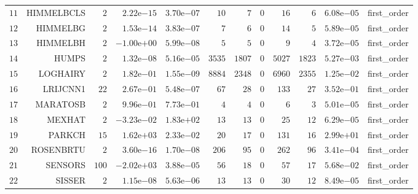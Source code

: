 \begin{longtable}{rrrrrrrrrrrr}
  \(    11\) & HIMMELBCLS & \(     2\) & \( 2.22\)e\(-15\) & \( 3.70\)e\(-07\) & \(    10\) & \(     7\) & \(     0\) & \(    16\) & \(     6\) & \( 6.08\)e\(-05\) & first\_order \\
  \(    12\) & HIMMELBG & \(     2\) & \( 1.53\)e\(-14\) & \( 3.83\)e\(-07\) & \(     7\) & \(     6\) & \(     0\) & \(    14\) & \(     5\) & \( 5.89\)e\(-05\) & first\_order \\
  \(    13\) & HIMMELBH & \(     2\) & \(-1.00\)e\(+00\) & \( 5.99\)e\(-08\) & \(     5\) & \(     5\) & \(     0\) & \(     9\) & \(     4\) & \( 3.72\)e\(-05\) & first\_order \\
  \(    14\) & HUMPS & \(     2\) & \( 1.32\)e\(-08\) & \( 5.16\)e\(-05\) & \(  3535\) & \(  1807\) & \(     0\) & \(  5027\) & \(  1823\) & \( 5.27\)e\(-03\) & first\_order \\
  \(    15\) & LOGHAIRY & \(     2\) & \( 1.82\)e\(-01\) & \( 1.55\)e\(-09\) & \(  8884\) & \(  2348\) & \(     0\) & \(  6960\) & \(  2355\) & \( 1.25\)e\(-02\) & first\_order \\
  \(    16\) & LRIJCNN1 & \(    22\) & \( 2.67\)e\(-01\) & \( 5.48\)e\(-07\) & \(    67\) & \(    28\) & \(     0\) & \(   133\) & \(    27\) & \( 3.52\)e\(-01\) & first\_order \\
  \(    17\) & MARATOSB & \(     2\) & \( 9.96\)e\(-01\) & \( 7.73\)e\(-01\) & \(     4\) & \(     4\) & \(     0\) & \(     6\) & \(     3\) & \( 5.01\)e\(-05\) & first\_order \\
  \(    18\) & MEXHAT & \(     2\) & \(-3.23\)e\(-02\) & \( 1.83\)e\(+02\) & \(    13\) & \(    13\) & \(     0\) & \(    25\) & \(    12\) & \( 6.29\)e\(-05\) & first\_order \\
  \(    19\) & PARKCH & \(    15\) & \( 1.62\)e\(+03\) & \( 2.33\)e\(-02\) & \(    20\) & \(    17\) & \(     0\) & \(   131\) & \(    16\) & \( 2.99\)e\(+01\) & first\_order \\
  \(    20\) & ROSENBRTU & \(     2\) & \( 3.60\)e\(-16\) & \( 1.70\)e\(-08\) & \(   206\) & \(    95\) & \(     0\) & \(   262\) & \(    96\) & \( 3.41\)e\(-04\) & first\_order \\
  \(    21\) & SENSORS & \(   100\) & \(-2.02\)e\(+03\) & \( 3.88\)e\(-05\) & \(    56\) & \(    18\) & \(     0\) & \(    57\) & \(    17\) & \( 5.68\)e\(-02\) & first\_order \\
  \(    22\) & SISSER & \(     2\) & \( 1.15\)e\(-08\) & \( 5.63\)e\(-06\) & \(    13\) & \(    13\) & \(     0\) & \(    30\) & \(    12\) & \( 8.49\)e\(-05\) & first\_order \\

\end{longtable}
